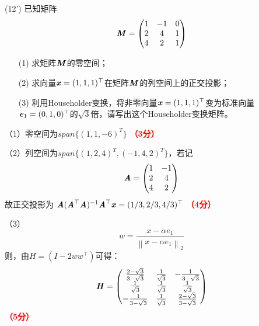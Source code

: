 \documentclass[12pt,a4paper,openany,twoside]{ctexbook}
\begin{document}
\begin{exercise}(12')
	已知矩阵\[ \boldsymbol{\mathit{M}} = \begin{pmatrix}
		1&-1&0\\2&4&1\\4&2&1
	\end{pmatrix}
	\]
	
	\begin{itemize}
		\item [(1)] 求矩阵$\boldsymbol{\mathit{M}}$的零空间；
		\item [(2)] 求向量$\boldsymbol{\mathit{x}}=(1,1,1)^{\top}$在矩阵$\boldsymbol{\mathit{M}}$的列空间上的正交投影；
		\item [(3)] 利用Householder变换，将非零向量$\boldsymbol{\mathit{x}}=(1, 1, 1)^{\top}$变为标准向量$\boldsymbol{\mathit{e}}_1=(0,1,0)^{\top}$的$\sqrt{3}$倍，请写出这个Householder变换矩阵。
	\end{itemize}
	
\end{exercise}
\begin{Solution}
	（1）零空间为$span\{(1,1,-6)^T\}$	 \hfill \textcolor{red}{\textbf{（3分）}}
	
	（2）列空间为$span\{(1,2,4)^T,(-1,4,2)^T\}$，若记
	\[ \boldsymbol{\mathit{A}} = \begin{pmatrix}
		1&-1\\2&4\\4&2
	\end{pmatrix}
	\]
	故正交投影为 $\boldsymbol{\mathit{A}} (\boldsymbol{\mathit{A}}^\top \boldsymbol{\mathit{A}})^{-1} \boldsymbol{\mathit{A}}^\top \boldsymbol{\mathit{x}} = (1/3,2/3,4/3)^\top$ \hfill \textcolor{red}{\textbf{（4分）}}
	
	（3）\begin{equation*}
		w=\frac{x-\alpha e_{1}}{\left\|x-\alpha e_{1}\right\|_{2}} \label{3}
	\end{equation*}
则，由$H =\left(I-2 w w^{\top}\right) $可得：\[ \boldsymbol{\mathit{H}} = \begin{pmatrix}
	\frac{2-\sqrt{3}}{3-\sqrt{3}}&\frac{1}{\sqrt{3}}&-\frac{1}{3-\sqrt{3}}\\\frac{1}{\sqrt{3}}&\frac{1}{\sqrt{3}}&\frac{1}{\sqrt{3}}\\-\frac{1}{3-\sqrt{3}}&\frac{1}{\sqrt{3}}&\frac{2-\sqrt{3}}{3-\sqrt{3}}
\end{pmatrix}
\] \hfill \textcolor{red}{\textbf{（5分）}}
\end{Solution}
\end{document}
